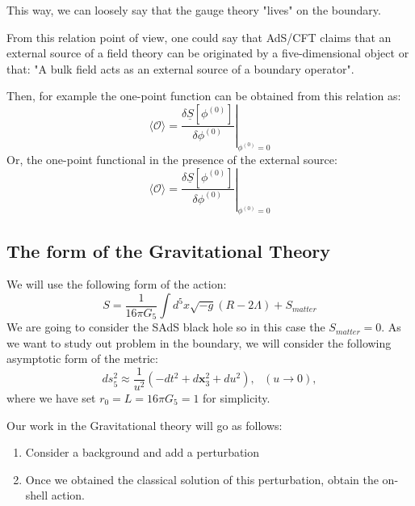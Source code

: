 \documentclass[12pt]{article}
\begin{document}
This way, we can loosely say that the gauge theory "lives" on the boundary.

\vspace{.25cm}

From this relation point of view, one could say that AdS/CFT claims that an external source of a field theory can be originated by a five-dimensional object or that: "A bulk field acts as an external source of a boundary operator".

Then, for example the one-point function can be obtained from this relation as:
\[
    \langle\mathcal{O}\rangle = \left.\frac{\delta \underline{S}[\phi^{(0)}]}{\delta\phi^{(0)}}\right|_{\phi^{(0)}=0}
\]
Or, the one-point functional in the presence of the external source:
\[
    \langle\mathcal{O}\rangle = \left.\frac{\delta \underline{S}[\phi^{(0)}]}{\delta\phi^{(0)}}\right|_{\phi^{(0)}=0}
\]

\subsection{The form of the Gravitational Theory}

We will use the following form of the action:
\[
    S = \frac{1}{16\pi G_5}\int d^5 x \sqrt{-g}(R-2\Lambda) + S_{matter}
\]
We are going to consider the SAdS black hole so in this case the $S_{matter}=0$. As we want to study out problem in the boundary, we will consider the following asymptotic form of the metric:
\[
    ds_5^2\approx \frac{1}{u^2}(-dt^2 + d\mathbf{x}_3^2 + du^2), ~~~ (u\rightarrow 0),
\]
where we have set $r_0=L=16\pi G_5 = 1$ for simplicity. 

\vspace{0.25cm}

Our work in the Gravitational theory will go as follows:
\begin{enumerate}
    \item Consider a background and add a perturbation
    \item Once we obtained the classical solution of this perturbation, obtain the on-shell action.
\end{enumerate}
\end{document}
